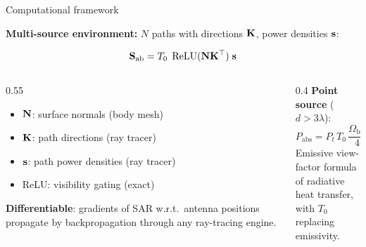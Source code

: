 \begin{frame}{Computational framework}

  \textbf{Multi-source environment:} $N$ paths with directions $\mathbf{K}$, power densities $\mathbf{s}$:

  \begin{resultbox}
    \vspace{-6pt}
    \[
      \mathbf{S}_{\mathrm{ab}} = T_0 \;\operatorname{ReLU}(\mathbf{N}\mathbf{K}^\top)\; \mathbf{s}
    \]
  \end{resultbox}

  \vspace{4pt}
  \begin{columns}[T]
    \begin{column}{0.55\textwidth}
      \begin{itemize}
        \item $\mathbf{N}$: surface normals (body mesh)
        \item $\mathbf{K}$: path directions (ray tracer)
        \item $\mathbf{s}$: path power densities (ray tracer)
        \item ReLU: visibility gating (exact)
      \end{itemize}

      \vspace{4pt}
      \textbf{Differentiable}: gradients of SAR w.r.t.\ antenna positions propagate by backpropagation through any ray-tracing engine.
    \end{column}

    \begin{column}{0.4\textwidth}
      \textbf{Point source} ($d > 3\lambda$):
      \[
        P_{\mathrm{abs}} = P_t \, T_0 \, \frac{\Omega_{\mathrm{body}}}{4\pi}
      \]
      {\footnotesize Emissive view-factor formula\\
       of radiative heat transfer,\\
       with $T_0$ replacing emissivity.}
    \end{column}
  \end{columns}
\end{frame}


